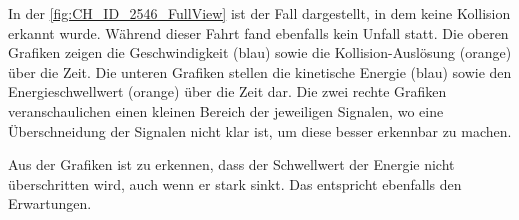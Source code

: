 

In der \autoref{fig:CH_ID_2546_FullView} ist der Fall dargestellt, in dem keine Kollision erkannt wurde. Während dieser Fahrt fand ebenfalls kein Unfall statt. 
Die oberen Grafiken zeigen die Geschwindigkeit (blau) sowie die Kollision-Auslösung (orange) über die Zeit.
Die unteren Grafiken stellen die kinetische Energie (blau) sowie den Energieschwellwert (orange) über die Zeit dar.
Die zwei rechte Grafiken veranschaulichen einen kleinen Bereich der jeweiligen Signalen, wo eine Überschneidung der Signalen nicht klar ist, um diese besser erkennbar zu machen.

Aus der Grafiken ist zu erkennen, dass der Schwellwert der Energie nicht überschritten wird, auch wenn er stark sinkt. Das entspricht ebenfalls den Erwartungen.



